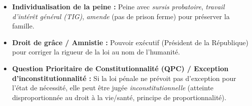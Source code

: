 \documentclass[11pt]{article}
\begin{document}
\begin{corrige}
\begin{enumerate}
\begin{itemize}
        \item \textbf{Individualisation de la peine :} Peine avec \emph{sursis probatoire}, \emph{travail d'intérêt général (TIG)}, \emph{amende} (pas de prison ferme) pour préserver la famille.
        \item \textbf{Droit de grâce / Amnistie :} Pouvoir exécutif (Président de la République) pour corriger la rigueur de la loi au nom de l'humanité.
        \item \textbf{Question Prioritaire de Constitutionnalité (QPC) / Exception d'inconstitutionnalité :} Si la loi pénale ne prévoit pas d'exception pour l'état de nécessité, elle peut être jugée \emph{inconstitutionnelle} (atteinte disproportionnée au droit à la vie/santé, principe de proportionnalité).
    \end{itemize}
\end{enumerate}
\end{corrige}
\end{document}
